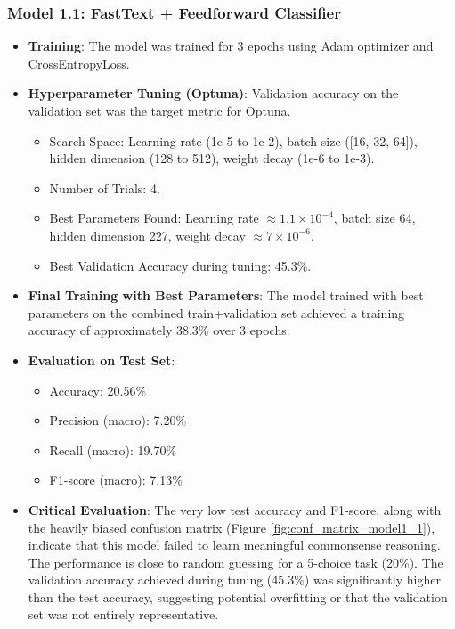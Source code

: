 \documentclass[10.5pt]{article}
\begin{document}
\subsubsection{Model 1.1: FastText + Feedforward Classifier}
\begin{itemize}
    \item \textbf{Training}: The model was trained for 3 epochs using Adam optimizer and CrossEntropyLoss.
    \item \textbf{Hyperparameter Tuning (Optuna)}: Validation accuracy on the validation set was the target metric for Optuna.
        \begin{itemize}
            \item Search Space: Learning rate (1e-5 to 1e-2), batch size ([16, 32, 64]), hidden dimension (128 to 512), weight decay (1e-6 to 1e-3).
            \item Number of Trials: 4.
            \item Best Parameters Found: Learning rate $\approx 1.1 \times 10^{-4}$, batch size 64, hidden dimension 227, weight decay $\approx 7 \times 10^{-6}$.
            \item Best Validation Accuracy during tuning: 45.3\%.
        \end{itemize}
    \item \textbf{Final Training with Best Parameters}: The model trained with best parameters on the combined train+validation set achieved a training accuracy of approximately 38.3\% over 3 epochs.
    \item \textbf{Evaluation on Test Set}:
        \begin{itemize}
            \item Accuracy: 20.56\%
            \item Precision (macro): 7.20\%
            \item Recall (macro): 19.70\%
            \item F1-score (macro): 7.13\%
        \end{itemize}
    \item \textbf{Critical Evaluation}: The very low test accuracy and F1-score, along with the heavily biased confusion matrix (Figure \ref{fig:conf_matrix_model1_1}), indicate that this model failed to learn meaningful commonsense reasoning. The performance is close to random guessing for a 5-choice task (20\%). The validation accuracy achieved during tuning (45.3\%) was significantly higher than the test accuracy, suggesting potential overfitting or that the validation set was not entirely representative.
\end{itemize}
\end{document}

